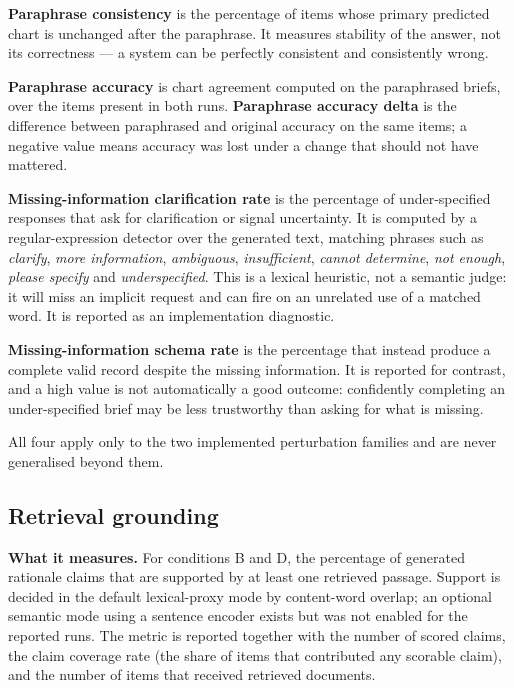 \textbf{Paraphrase consistency} is the percentage of items whose primary predicted chart is unchanged after the paraphrase. It measures stability of the answer, not its correctness --- a system can be perfectly consistent and consistently wrong.

\textbf{Paraphrase accuracy} is chart agreement computed on the paraphrased briefs, over the items present in both runs. \textbf{Paraphrase accuracy delta} is the difference between paraphrased and original accuracy on the same items; a negative value means accuracy was lost under a change that should not have mattered.

\textbf{Missing-information clarification rate} is the percentage of under-specified responses that ask for clarification or signal uncertainty. It is computed by a regular-expression detector over the generated text, matching phrases such as \emph{clarify}, \emph{more information}, \emph{ambiguous}, \emph{insufficient}, \emph{cannot determine}, \emph{not enough}, \emph{please specify} and \emph{underspecified}. This is a lexical heuristic, not a semantic judge: it will miss an implicit request and can fire on an unrelated use of a matched word. It is reported as an implementation diagnostic.

\textbf{Missing-information schema rate} is the percentage that instead produce a complete valid record despite the missing information. It is reported for contrast, and a high value is not automatically a good outcome: confidently completing an under-specified brief may be less trustworthy than asking for what is missing.

All four apply only to the two implemented perturbation families and are never generalised beyond them.

\subsection{Retrieval grounding}

\textbf{What it measures.} For conditions B and D, the percentage of generated rationale claims that are supported by at least one retrieved passage. Support is decided in the default lexical-proxy mode by content-word overlap; an optional semantic mode using a sentence encoder exists but was not enabled for the reported runs. The metric is reported together with the number of scored claims, the claim coverage rate (the share of items that contributed any scorable claim), and the number of items that received retrieved documents.

